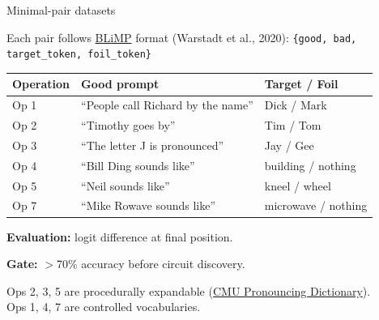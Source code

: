 \documentclass[10pt,aspectratio=169]{beamer}
\begin{document}
\begin{frame}
\begin{center}
\vfill
  {\setlength{\fboxrule}{2.5pt}}
\vfill
\end{center}
\end{frame}

\begin{frame}{Minimal-pair datasets}
\hypertarget{sl:datasets}{}

Each pair follows \href{https://arxiv.org/abs/1912.00582}{BLiMP} format {\scriptsize(Warstadt et al., 2020)}: \texttt{\{good, bad, target\_token, foil\_token\}}

\vspace{0.5em}
\begin{center}
\footnotesize
\begin{tabular}{lll}
\toprule
\textbf{Operation} & \textbf{Good prompt} & \textbf{Target / Foil} \\
\midrule
Op 1 & ``People call Richard by the name'' & Dick / Mark \\
Op 2 & ``Timothy goes by'' & Tim / Tom \\
Op 3 & ``The letter J is pronounced'' & Jay / Gee \\
Op 4 & ``Bill Ding sounds like'' & building / nothing \\
Op 5 & ``Neil sounds like'' & kneel / wheel \\
Op 7 & ``Mike Rowave sounds like'' & microwave / nothing \\
\bottomrule
\end{tabular}
\end{center}

\vspace{0.5em}
\textbf{Evaluation:} logit difference at final position.

\textbf{Gate:} $>$70\% accuracy before circuit discovery.

\vspace{0.5em}
Ops 2, 3, 5 are procedurally expandable (\href{http://www.speech.cs.cmu.edu/cgi-bin/cmudict}{CMU Pronouncing Dictionary}).\\
Ops 1, 4, 7 are controlled vocabularies.
\end{frame}
\end{document}

